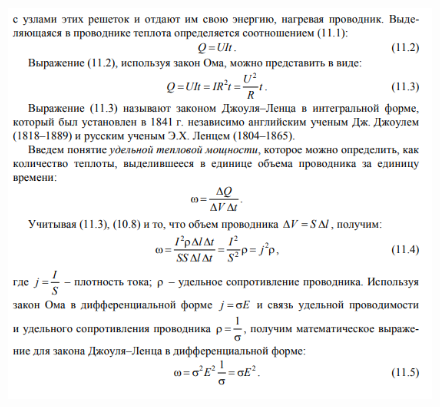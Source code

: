 \begin{figure}[h]
    \centering
    \includegraphics[width=0.5\linewidth]{imgs/q31i3.png}
\end{figure}



